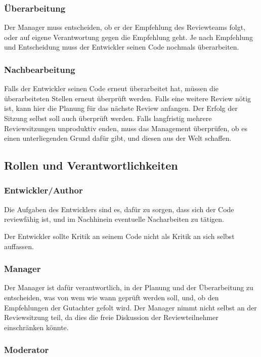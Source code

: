 \documentclass[	%
		fontsize=11pt,  %
		a4paper,	    %
		ngerman,		%
		sans,			%
		f4,				%
	]{HsH-report}		%
\begin{document}
\subsubsection{Überarbeitung}

Der Manager muss entscheiden, ob er der Empfehlung des Reviewteams folgt, oder
auf eigene Verantwortung gegen die Empfehlung geht. Je nach Empfehlung und
Entscheidung muss der Entwickler seinen Code nochmals überarbeiten.

\subsubsection{Nachbearbeitung}

Falls der Entwickler seinen Code erneut überarbeitet hat, müssen die
überarbeiteten Stellen erneut überprüft werden. Falls eine weitere Review nötig
ist, kann hier die Planung für das nächste Review anfangen. Der Erfolg der
Sitzung selbst soll auch überprüft werden. Falls langfristig mehrere
Reviewsitzungen unproduktiv enden, muss das Management überprüfen, ob es einen
unterliegenden Grund dafür gibt, und diesen aus der Welt schaffen.

\subsection{Rollen und Verantwortlichkeiten}
\subsubsection{Entwickler/Author}

Die Aufgaben des Entwicklers sind es, dafür zu sorgen, dass sich der Code
reviewfähig ist, und im Nachhinein eventuelle Nacharbeiten zu tätigen.

Der Entwickler sollte Kritik an seinem Code nicht als Kritik an sich selbst
auffassen.

\subsubsection{Manager}

Der Manager ist dafür verantwortlich, in der Planung und der Überarbeitung zu
entscheiden, was von wem wie wann geprüft werden soll, und, ob den Empfehlungen
der Gutachter gefolt wird. Der Manager nimmt nicht selbst an der Reviewsitzung
teil, da dies die freie Diskussion der Reviewteilnehmer einschränken könnte.

\subsubsection{Moderator}
\end{document}
